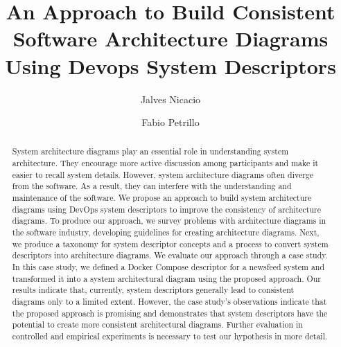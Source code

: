 \documentclass[sigconf]{acmart}
\begin{document}
\title{An Approach to Build Consistent Software Architecture Diagrams Using Devops System Descriptors}

\author{Jalves Nicacio}

\author{Fabio Petrillo}



\renewcommand{\shortauthors}{Nicacio and Petrillo}

\begin{abstract}
System architecture diagrams play an essential role in understanding system architecture. They encourage more active discussion among participants and make it easier to recall system details.
However, system architecture diagrams often diverge from the software. As a result, they can interfere with the understanding and maintenance of the software.
We propose an approach to build system architecture diagrams using DevOps system descriptors to improve the consistency of architecture diagrams. 
To produce our approach, we survey problems with architecture diagrams in the software industry, developing guidelines for creating architecture diagrams.
Next, we produce a taxonomy for system descriptor concepts and a process to convert system descriptors into architecture diagrams.
We evaluate our approach through a case study. In this case study, we defined a Docker Compose descriptor for a newsfeed system and transformed it into a system architectural diagram using the proposed approach. 
Our results indicate that, currently, system descriptors generally lead to consistent diagrams only to a limited extent. However, the case study's observations indicate that the proposed approach is promising and demonstrates that system descriptors have the potential to create more consistent architectural diagrams.
Further evaluation in controlled and empirical experiments is necessary to test our hypothesis in more detail.

\end{abstract}
\end{document}
